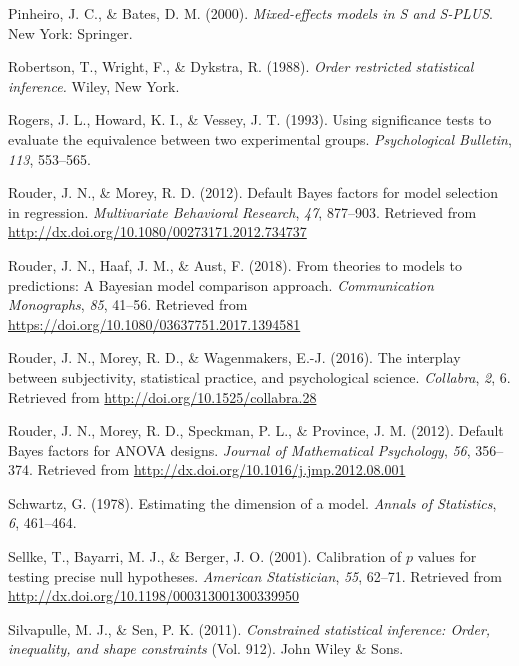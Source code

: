 \documentclass[english,man]{apa6}
\theoremstyle{definition}
\theoremstyle{definition}
\theoremstyle{definition}
\theoremstyle{remark}
\begin{document}
\hypertarget{ref-Pinheiro:Bates:2000}{}
Pinheiro, J. C., \& Bates, D. M. (2000). \emph{Mixed-effects models in S
and S-PLUS}. New York: Springer.

\hypertarget{ref-Robertson:etal:1988}{}
Robertson, T., Wright, F., \& Dykstra, R. (1988). \emph{Order restricted
statistical inference.} Wiley, New York.

\hypertarget{ref-Rogers:etal:1993}{}
Rogers, J. L., Howard, K. I., \& Vessey, J. T. (1993). Using
significance tests to evaluate the equivalence between two experimental
groups. \emph{Psychological Bulletin}, \emph{113}, 553--565.

\hypertarget{ref-Rouder:Morey:2012}{}
Rouder, J. N., \& Morey, R. D. (2012). Default Bayes factors for model
selection in regression. \emph{Multivariate Behavioral Research},
\emph{47}, 877--903. Retrieved from
\url{http://dx.doi.org/10.1080/00273171.2012.734737}

\hypertarget{ref-Rouder:etal:2018}{}
Rouder, J. N., Haaf, J. M., \& Aust, F. (2018). From theories to models
to predictions: A Bayesian model comparison approach.
\emph{Communication Monographs}, \emph{85}, 41--56. Retrieved from
\url{https://doi.org/10.1080/03637751.2017.1394581}

\hypertarget{ref-Rouder:etal:2016b}{}
Rouder, J. N., Morey, R. D., \& Wagenmakers, E.-J. (2016). The interplay
between subjectivity, statistical practice, and psychological science.
\emph{Collabra}, \emph{2}, 6. Retrieved from
\url{http://doi.org/10.1525/collabra.28}

\hypertarget{ref-Rouder:etal:2012}{}
Rouder, J. N., Morey, R. D., Speckman, P. L., \& Province, J. M. (2012).
Default Bayes factors for ANOVA designs. \emph{Journal of Mathematical
Psychology}, \emph{56}, 356--374. Retrieved from
\url{http://dx.doi.org/10.1016/j.jmp.2012.08.001}

\hypertarget{ref-Schwartz:1978}{}
Schwartz, G. (1978). Estimating the dimension of a model. \emph{Annals
of Statistics}, \emph{6}, 461--464.

\hypertarget{ref-Sellke:etal:2001}{}
Sellke, T., Bayarri, M. J., \& Berger, J. O. (2001). Calibration of
\(p\) values for testing precise null hypotheses. \emph{American
Statistician}, \emph{55}, 62--71. Retrieved from
\url{http://dx.doi.org/10.1198/000313001300339950}

\hypertarget{ref-Silvapulle:Sen:2011}{}
Silvapulle, M. J., \& Sen, P. K. (2011). \emph{Constrained statistical
inference: Order, inequality, and shape constraints} (Vol. 912). John
Wiley \& Sons.
\end{document}
